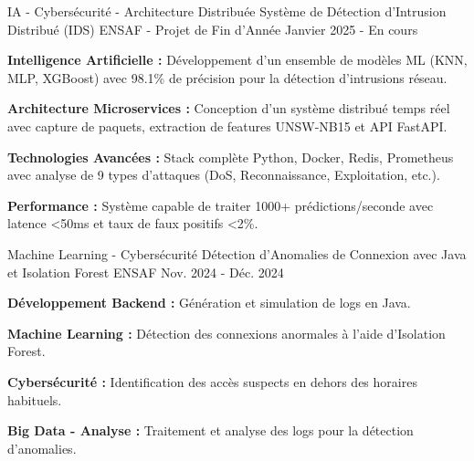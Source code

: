 
\begin{cventries}

  \cventry
    {IA - Cybersécurité - Architecture Distribuée} 
    {Système de Détection d'Intrusion Distribué (IDS)} %
    {ENSAF - Projet de Fin d'Année} %
    {Janvier 2025 - En cours} %
    {
      \begin{cvitems} %
        \item {
         \textbf{Intelligence Artificielle :}
         Développement d'un ensemble de modèles ML (KNN, MLP, XGBoost) avec 98.1\% de précision pour la détection d'intrusions réseau.}
        \item {
        \textbf{Architecture Microservices :}
         Conception d'un système distribué temps réel avec capture de paquets, extraction de features UNSW-NB15 et API FastAPI.}
        \item {
        \textbf{Technologies Avancées :}
         Stack complète Python, Docker, Redis, Prometheus avec analyse de 9 types d'attaques (DoS, Reconnaissance, Exploitation, etc.).}
        \item {
        \textbf{Performance :}
        Système capable de traiter 1000+ prédictions/seconde avec latence <50ms et taux de faux positifs <2\%.}
      \end{cvitems}
    }

  \cventry
    {Machine Learning - Cybersécurité} 
    {Détection d'Anomalies de Connexion avec Java et Isolation Forest} %
    {ENSAF} %
    {Nov. 2024 - Déc. 2024} %
    {
      \begin{cvitems} %
        \item {
         \textbf{Développement Backend :}
         Génération et simulation de logs en Java.}
        \item {
        \textbf{Machine Learning :}
         Détection des connexions anormales à l’aide d’Isolation Forest.}
        \item {
        \textbf{Cybersécurité :}
         Identification des accès suspects en dehors des horaires habituels.}
        \item {
        \textbf{Big Data - Analyse :}
        Traitement et analyse des logs pour la détection d’anomalies.}
      \end{cvitems}
    }


\end{cventries}
